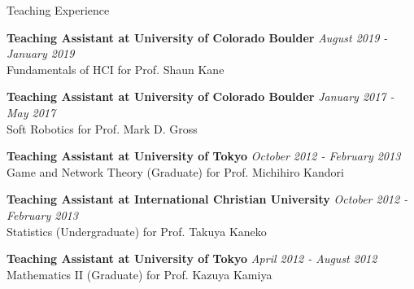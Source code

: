 \documentclass{resume} %
\begin{document}
\begin{rSection}{Teaching Experience}

{\bf Teaching Assistant at University of Colorado Boulder} \hfill {\em August 2019 - January 2019} \\
Fundamentals of HCI for Prof. Shaun Kane

{\bf Teaching Assistant at University of Colorado Boulder} \hfill {\em January 2017 - May 2017} \\
Soft Robotics for Prof. Mark D. Gross

{\bf Teaching Assistant at University of Tokyo} \hfill {\em October 2012 - February 2013} \\
Game and Network Theory (Graduate) for Prof. Michihiro Kandori

{\bf Teaching Assistant at International Christian University} \hfill {\em October 2012 - February 2013} \\
Statistics (Undergraduate) for Prof. Takuya Kaneko

{\bf Teaching Assistant at University of Tokyo} \hfill {\em April 2012 - August 2012} \\
Mathematics II (Graduate) for Prof. Kazuya Kamiya


\end{rSection}






\end{document}
